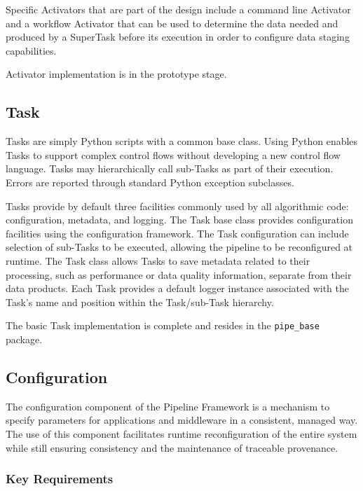 \documentclass[DM,lsstdraft,toc]{lsstdoc}
\begin{document}
Specific Activators that are part of the design include a command line
Activator and a workflow Activator that can be used to determine the data
needed and produced by a SuperTask before its execution in order to configure
data staging capabilities.

Activator implementation is in the prototype stage.

\subsection{Task}\label{task}

Tasks are simply Python scripts with a common base class. Using Python enables
Tasks to support complex control flows without developing a new control flow
language. Tasks may hierarchically call sub-Tasks as part of their execution.
Errors are reported through standard Python exception subclasses.

Tasks provide by default three facilities commonly used by all algorithmic
code: configuration, metadata, and logging.  The Task base class provides
configuration facilities using the configuration framework. The Task
configuration can include selection of sub-Tasks to be executed, allowing the
pipeline to be reconfigured at runtime.  The Task class allows Tasks to save
metadata related to their processing, such as performance or data quality
information, separate from their data products.  Each Task provides a default
logger instance associated with the Task's name and position within the
Task/sub-Task hierarchy.

The basic Task implementation is complete and resides in the
\texttt{pipe\_base} package.

\subsection{Configuration}\label{configuration}

The configuration component of the Pipeline Framework is a mechanism to
specify parameters for applications and middleware in a consistent,
managed way. The use of this component facilitates runtime
reconfiguration of the entire system while still ensuring consistency
and the maintenance of traceable provenance.

\subsubsection{Key Requirements}\label{configuration-reqs}
\end{document}
